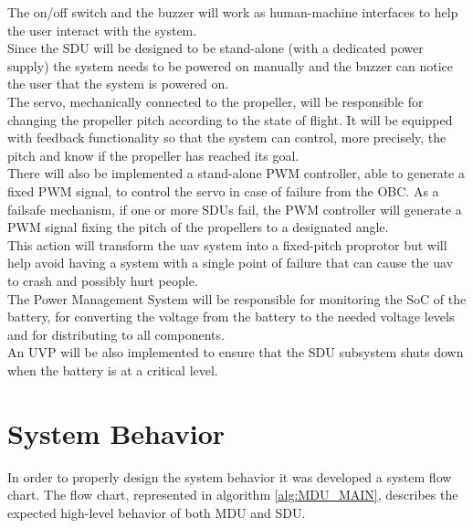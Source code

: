 The on/off switch and the buzzer will work as human-machine interfaces to help the user interact with the system.\\
Since the SDU will be designed to be stand-alone (with a dedicated power supply) the system needs to be powered on manually and the buzzer can notice the user that the system is powered on.\\

The servo, mechanically connected to the propeller, will be responsible for changing the propeller pitch according to the state of flight.
It will be equipped with feedback functionality so that the system can control, more precisely, the pitch and know if the propeller has reached its goal.\\

There will also be implemented a stand-alone \gls{PWM} controller, able to generate a fixed \gls{PWM} signal, to control the servo in case of failure from the \gls{OBC}.
As a failsafe mechanism, if one or more SDUs fail, the \gls{PWM} controller will generate a \gls{PWM} signal fixing the pitch of the propellers to a designated angle.\\
This action will transform the \gls{uav} system into a fixed-pitch proprotor but will help avoid having a system with a single point of failure that can cause the \gls{uav} to crash and possibly hurt people.\\

The Power Management System will be responsible for monitoring the \gls{SoC} of the battery, for converting the voltage from the battery to the needed voltage levels and for distributing to all components.\\
An \gls{UVP} will be also implemented to ensure that the SDU subsystem shuts down when the battery is at a critical level.


\section{System Behavior}

In order to properly design the system behavior it was developed a system flow chart.
The flow chart, represented in algorithm \ref{alg:MDU_MAIN}, describes the expected high-level behavior of both MDU and SDU.
 
